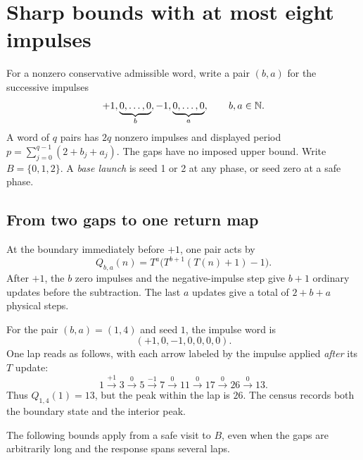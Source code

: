 \section{Sharp bounds with at most eight impulses}\label{sec:impulses}

For a nonzero conservative admissible word, write a pair $(b,a)$ for
the successive impulses
\[
 +1,\underbrace{0,\ldots,0}_{b},-1,\underbrace{0,\ldots,0}_{a},
 \qquad b,a\in\mathbb N.
\]
A word of $q$ pairs has $2q$ nonzero impulses and displayed period
$p=\sum_{j=0}^{q-1}(2+b_j+a_j)$. The gaps have no imposed upper bound.
Write $B=\{0,1,2\}$. A \emph{base launch} is seed 1 or 2 at any phase,
or seed zero at a safe phase.

\subsection{From two gaps to one return map}

At the boundary immediately before $+1$, one pair acts by
\begin{equation}\label{eq:pair-return-map}
 Q_{b,a}(n)=T^a\bigl(T^{b+1}(T(n)+1)-1\bigr).
\end{equation}
After $+1$, the $b$ zero impulses and the negative-impulse step give
$b+1$ ordinary updates before the subtraction. The last $a$ updates
give a total of $2+b+a$ physical steps.

For the pair $(b,a)=(1,4)$ and seed $1$, the impulse word is
\[
 (+1,0,-1,0,0,0,0).
\]
One lap reads as follows, with each arrow labeled by the impulse
applied \emph{after} its $T$ update:
\begin{equation}\label{eq:pair14-first-lap}
 1\xrightarrow{+1}3\xrightarrow{0}5\xrightarrow{-1}7
 \xrightarrow{0}11\xrightarrow{0}17\xrightarrow{0}26
 \xrightarrow{0}13.
\end{equation}
Thus $Q_{1,4}(1)=13$, but the peak within the lap is $26$.
The census records both the boundary state and the interior peak.

The following bounds apply from a safe visit to $B$, even when the
gaps are arbitrarily long and the response spans several laps.

